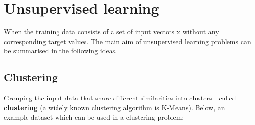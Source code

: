 \documentclass[]{book}
\begin{document}
\section{Unsupervised learning}\label{unsupervised-learning}

When the training data consists of a set of input vectors x without any
corresponding target values. The main aim of unsupervised learning
problems can be summarised in the following ideas.

\subsection{Clustering}\label{clustering}

Grouping the input data that share different similarities into clusters
- called \textbf{clustering} (a widely known clustering algorithm is
\href{https://stanford.edu/~cpiech/cs221/handouts/kmeans.html}{K-Means}).
Below, an example dataset which can be used in a clustering problem:
\end{document}
